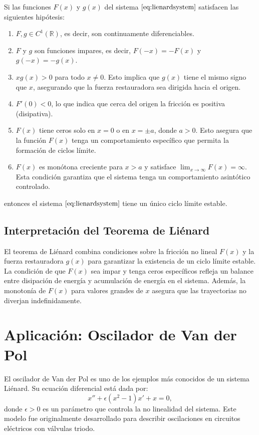 \begin{theorem}[Liénard]
	Si las funciones $F(x)$ y $g(x)$ del sistema $\eqref{eq:lienardsystem}$ satisfacen las siguientes hipótesis:
	\begin{enumerate}
		\item $F, g \in C^1(\mathbb{R})$, es decir, son continuamente diferenciables.
		\item $F$ y $g$ son funciones impares, es decir, $F(-x) = -F(x)$ y $g(-x) = -g(x)$.
		\item $x g(x) > 0$ para todo $x \neq 0$. Esto implica que $g(x)$ tiene el mismo signo que $x$, asegurando que la fuerza restauradora sea dirigida hacia el origen.
		\item $F'(0) < 0$, lo que indica que cerca del origen la fricción es positiva (disipativa).
		\item $F(x)$ tiene ceros solo en $x = 0$ o en $x = \pm a$, donde $a > 0$. Esto asegura que la función $F(x)$ tenga un comportamiento específico que permita la formación de ciclos límite.
		\item $F(x)$ es monótona creciente para $x > a$ y satisface $\lim_{x \to \infty} F(x) = \infty$. Esta condición garantiza que el sistema tenga un comportamiento asintótico controlado.
	\end{enumerate}
	entonces el sistema $\eqref{eq:lienardsystem}$ tiene un único ciclo límite estable.
\end{theorem}

\subsection{Interpretación del Teorema de Liénard}

El teorema de Liénard combina condiciones sobre la fricción no lineal $F(x)$ y la fuerza restauradora $g(x)$ para garantizar la existencia de un ciclo límite estable. La condición de que $F(x)$ sea impar y tenga ceros específicos refleja un balance entre disipación de energía y acumulación de energía en el sistema. Además, la monotonía de $F(x)$ para valores grandes de $x$ asegura que las trayectorias no diverjan indefinidamente.

\section{Aplicación: Oscilador de Van der Pol}

El oscilador de Van der Pol es uno de los ejemplos más conocidos de un sistema Liénard. Su ecuación diferencial está dada por:
\[
x'' + \epsilon (x^2 - 1)x' + x = 0,
\]
donde $\epsilon > 0$ es un parámetro que controla la no linealidad del sistema. Este modelo fue originalmente desarrollado para describir oscilaciones en circuitos eléctricos con válvulas triodo.

